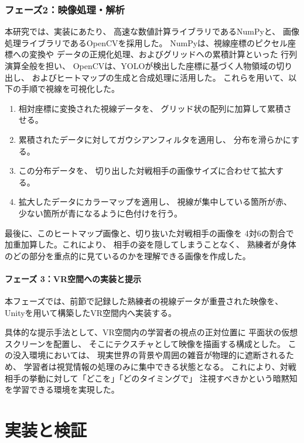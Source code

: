 \documentclass[dvipdfmx]{ujreport}
\begin{document}
\subsection{フェーズ2：映像処理・解析}
    本研究では、実装にあたり、
    高速な数値計算ライブラリであるNumPyと、
    画像処理ライブラリであるOpenCVを採用した。
    NumPyは、視線座標のピクセル座標への変換や
    データの正規化処理、およびグリッドへの累積計算といった
    行列演算全般を担い、
    OpenCVは、YOLOが検出した座標に基づく人物領域の切り出し、
    およびヒートマップの生成と合成処理に活用した。
    これらを用いて、以下の手順で視線を可視化した。

    \begin{enumerate}
        \item 相対座標に変換された視線データを、
        グリッド状の配列に加算して累積させる。
        \item 累積されたデータに対してガウシアンフィルタを適用し、
        分布を滑らかにする。
        \item この分布データを、
        切り出した対戦相手の画像サイズに合わせて拡大する。
        \item 拡大したデータにカラーマップを適用し、
        視線が集中している箇所が赤、少ない箇所が青になるように色付けを行う。
    \end{enumerate}

    最後に、このヒートマップ画像と、切り抜いた対戦相手の画像を
    4対6の割合で加重加算した。これにより、
    相手の姿を隠してしまうことなく、
    熟練者が身体のどの部分を重点的に見ているのかを理解できる画像を作成した。

    \subsubsection{フェーズ 3：VR空間への実装と提示}
    本フェーズでは、前節で記録した熟練者の視線データが重畳された映像を、
    Unityを用いて構築したVR空間内へ実装する。
    
    具体的な提示手法として、VR空間内の学習者の視点の正対位置に
    平面状の仮想スクリーンを配置し、
    そこにテクスチャとして映像を描画する構成とした。
    この没入環境においては、
    現実世界の背景や周囲の雑音が物理的に遮断されるため、
    学習者は視覚情報の処理のみに集中できる状態となる。
    これにより、対戦相手の挙動に対して「どこを」「どのタイミングで」
    注視すべきかという暗黙知を学習できる環境を実現した。

\chapter{実装と検証}
\end{document}
